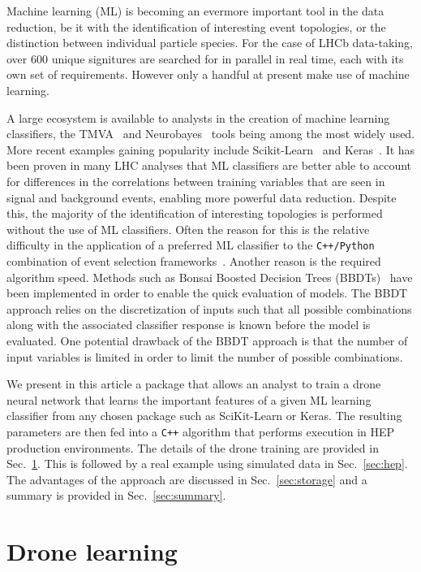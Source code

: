 \documentclass[final,5p,times,twocolumn]{elsarticle}
\def\lhcb {\mbox{LHCb}\xspace}
\begin{document}
Machine learning (ML) is becoming an evermore important tool in the data reduction,
be it with the identification of interesting event topologies, or the distinction
between individual particle species. For the case of \lhcb data-taking, over 600
unique signitures are searched for in parallel in real time, each with its own set of requirements.
However only a handful at present make use of machine learning.

A large ecosystem is available to analysts in the creation of machine learning classifiers,
the TMVA~\cite{Hocker:2007ht} and Neurobayes~\cite{Feindt:2006pm} tools being among the most widely used.
More recent examples gaining popularity include Scikit-Learn~\cite{Pedregosa:2012toh}
and Keras~\cite{keras}. It has been proven in many LHC analyses that
ML classifiers are better able to account for differences in the correlations between
training variables that are seen in signal and background events, enabling more
powerful data reduction.
Despite this, the majority of the identification of interesting topologies is performed
without the use of ML classifiers. Often the reason for this is the relative difficulty in
the application of a preferred ML classifier to the {\tt C++/Python} combination
of event selection frameworks~\cite{Barrand:2001ny}. Another
reason is the required algorithm speed. Methods such as Bonsai
Boosted Decision Trees (BBDTs)~\cite{Gligorov:2012qt} have been implemented in order
to enable the quick evaluation of models. The BBDT approach relies on the
discretization of inputs such that all possible combinations along with
the associated classifier response is known before the model is evaluated.
One potential drawback of the BBDT approach is that the number of input variables is limited
in order to limit the number of possible combinations.

We present in this article a package that allows an analyst to
train a drone neural network that learns the important features of a
given ML learning classifier from any chosen package such as SciKit-Learn or Keras.
The resulting parameters are then fed into a {\tt C++} algorithm that
performs execution in HEP production environments. The details of the
drone training are provided in Sec.~\ref{sec:dlearn}. This is followed
by a real example using simulated data in Sec.~\ref{sec:hep}. The advantages
of the approach are discussed in Sec.~\ref{sec:storage} and a summary is
provided in Sec.~\ref{sec:summary}.


\section{Drone learning}
\label{sec:dlearn}
\end{document}
